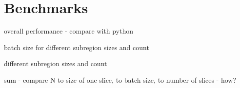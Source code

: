 \chapter{Benchmarks}

overall performance - compare with python

batch size for different subregion sizes and count

different subregion sizes and count

sum - compare N to size of one slice, to batch size, to number of slices - how?